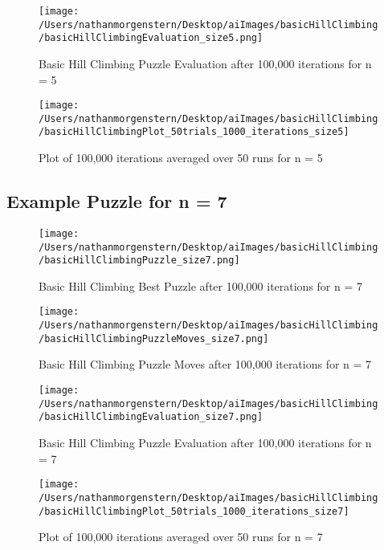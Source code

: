 \documentclass{report}
\begin{document}
	\begin{figure}[H]
	\centering
	\texttt{[image: /Users/nathanmorgenstern/Desktop/aiImages/basicHillClimbing/basicHillClimbingEvaluation\_size5.png]}
	\caption{Basic Hill Climbing Puzzle Evaluation after 100,000 iterations for n = 5} 
	\label{fig: Basic Hill Climbing Puzzle Evaluation after 100,000 iterations for n = 5}
	\end{figure}
	
	\begin{figure}[H]
	\centering
	\texttt{[image: /Users/nathanmorgenstern/Desktop/aiImages/basicHillClimbing/basicHillClimbingPlot\_50trials\_1000\_iterations\_size5]}
	\caption{Plot of 100,000 iterations averaged over 50 runs for n = 5} 
	\label{fig: Plot of 100,000 iterations averaged over 50 runs for n = 5}
	\end{figure}

\subsection{Example Puzzle for n = 7}

	\begin{figure}[H]
	\centering
	\texttt{[image: /Users/nathanmorgenstern/Desktop/aiImages/basicHillClimbing/basicHillClimbingPuzzle\_size7.png]}
	\caption{Basic Hill Climbing Best Puzzle after 100,000 iterations for n = 7} 
	\label{fig: Basic Hill Climbing Best Puzzle after 100,000 iterations for n = 7}
	\end{figure}
	
	\begin{figure}[H]
	\centering
	\texttt{[image: /Users/nathanmorgenstern/Desktop/aiImages/basicHillClimbing/basicHillClimbingPuzzleMoves\_size7.png]}
	\caption{Basic Hill Climbing Puzzle Moves  after 100,000 iterations for n = 7} 
	\label{fig: Basic Hill Climbing Puzzle Moves after 100,000 iterations for n = 7}
	\end{figure}

	\begin{figure}[H]
	\centering
	\texttt{[image: /Users/nathanmorgenstern/Desktop/aiImages/basicHillClimbing/basicHillClimbingEvaluation\_size7.png]}
	\caption{Basic Hill Climbing Puzzle Evaluation after 100,000 iterations for n = 7} 
	\label{fig: Basic Hill Climbing Puzzle Evaluation after 100,000 iterations for n = 7}
	\end{figure}
	
	\begin{figure}[H]
	\centering
	\texttt{[image: /Users/nathanmorgenstern/Desktop/aiImages/basicHillClimbing/basicHillClimbingPlot\_50trials\_1000\_iterations\_size7]}
	\caption{Plot of 100,000 iterations averaged over 50 runs for n = 7}
	\label{fig: Plot of 100,000 iterations averaged over 50 runs for n = 7}
	\end{figure}
	
\end{document}
